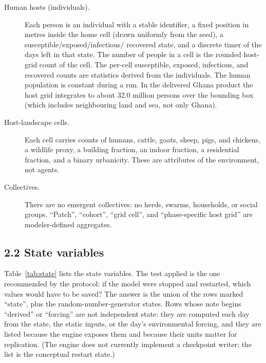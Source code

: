 \documentclass[11pt,a4paper]{article}
\begin{document}
\begin{description}
\item[Human hosts (individuals).] Each person is an individual with a
  stable identifier, a fixed position in metres inside the home cell
  (drawn uniformly from the seed), a susceptible/exposed/infectious/
  recovered state, and a discrete timer of the days left in that state.
  The number of people in a cell is the rounded host-grid count of the
  cell. The per-cell susceptible, exposed, infectious, and recovered
  counts are statistics derived from the individuals. The human
  population is constant during a run. In the delivered Ghana product the host grid
  integrates to about 32.0 million persons over the bounding box (which
  includes neighbouring land and sea, not only Ghana).

\item[Host-landscape cells.] Each cell carries counts of humans, cattle,
  goats, sheep, pigs, and chickens, a wildlife proxy, a building
  fraction, an indoor fraction, a residential fraction, and a binary
  urbanicity. These are attributes of the environment, not agents.

\item[Collectives.] There are no emergent collectives: no herds, swarms,
  households, or social groups. ``Patch'', ``cohort'', ``grid cell'', and
  ``phase-specific host grid'' are modeler-defined aggregates.
\end{description}

\subsection*{2.2 State variables}

Table~\ref{tab:state} lists the state variables. The test applied is the
one recommended by the protocol: if the model were stopped and restarted,
which values would have to be saved? The answer is the union of the rows
marked ``state'', plus the random-number-generator states. Rows whose note
begins ``derived'' or ``forcing'' are not independent state: they are
computed each day from the state, the static inputs, or the day's
environmental forcing, and they are listed because the engine exposes them
and because their units matter for replication. (The engine does not
currently implement a checkpoint writer; the list is the conceptual
restart state.)
\end{document}
